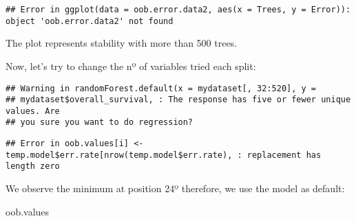 \documentclass[
]{article}
\newenvironment{Shaded}{\begin{snugshade}}{\end{snugshade}}
\newcommand{\ControlFlowTok}[1]{\textcolor[rgb]{0.13,0.29,0.53}{\textbf{#1}}}
\newcommand{\DataTypeTok}[1]{\textcolor[rgb]{0.13,0.29,0.53}{#1}}
\newcommand{\DecValTok}[1]{\textcolor[rgb]{0.00,0.00,0.81}{#1}}
\newcommand{\KeywordTok}[1]{\textcolor[rgb]{0.13,0.29,0.53}{\textbf{#1}}}
\newcommand{\NormalTok}[1]{#1}
\newcommand{\OperatorTok}[1]{\textcolor[rgb]{0.81,0.36,0.00}{\textbf{#1}}}
\newcommand{\OtherTok}[1]{\textcolor[rgb]{0.56,0.35,0.01}{#1}}
\newcommand{\StringTok}[1]{\textcolor[rgb]{0.31,0.60,0.02}{#1}}
\begin{document}
\begin{verbatim}
## Error in ggplot(data = oob.error.data2, aes(x = Trees, y = Error)): object 'oob.error.data2' not found
\end{verbatim}

The plot represents stability with more than 500 trees.

Now, let's try to change the nº of variables tried each split:

\begin{Shaded}
\end{Shaded}

\begin{verbatim}
## Warning in randomForest.default(x = mydataset[, 32:520], y =
## mydataset$overall_survival, : The response has five or fewer unique values. Are
## you sure you want to do regression?
\end{verbatim}

\begin{verbatim}
## Error in oob.values[i] <- temp.model$err.rate[nrow(temp.model$err.rate), : replacement has length zero
\end{verbatim}

We observe the minimum at position 24º therefore, we use the model as
default:

\begin{Shaded}
\begin{Highlighting}[]
\NormalTok{oob.values}
\end{Highlighting}
\end{Shaded}
\end{document}
